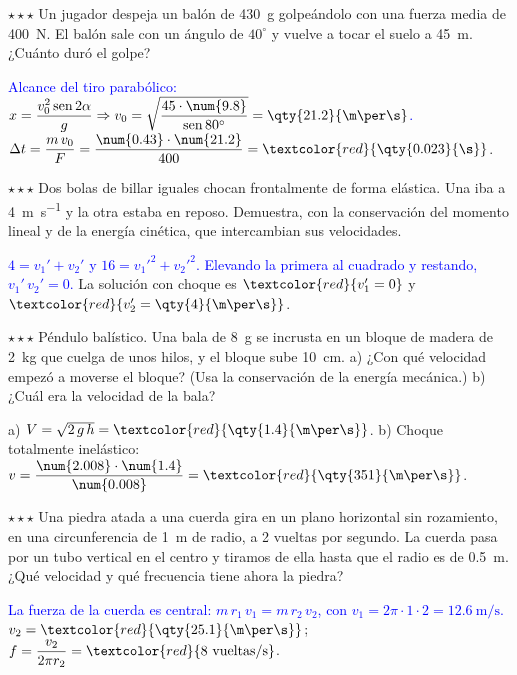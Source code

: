 \begin{exercise}
    \(\star\star\star\) Un jugador despeja un balón de \qty{430}{\g} golpeándolo con una fuerza media de \qty{400}{\newton}. El balón
    sale con un ángulo de \(40^\circ\) y vuelve a tocar el suelo a \qty{45}{\m}. ¿Cuánto duró el golpe?
    \begin{solu}
        \textcolor{blue}{Alcance del tiro parabólico: \(x = \dfrac{v_0^2\sen 2\alpha}{g} \Rightarrow v_0 = \sqrt{\dfrac{45 \cdot \num{9.8}}{\sen 80^\circ}} = \qty{21.2}{\m\per\s}\).}
        \(\Delta t = \dfrac{m\,v_0}{F} = \dfrac{\num{0.43} \cdot \num{21.2}}{400} = \textcolor{red}{\qty{0.023}{\s}}\).
    \end{solu}
\end{exercise}

\begin{exercise}
    \(\star\star\star\) Dos bolas de billar iguales chocan frontalmente de forma elástica. Una iba a \qty{4}{\m\per\s} y la otra
    estaba en reposo. Demuestra, con la conservación del momento lineal y de la energía cinética, que intercambian sus velocidades.
    \begin{solu}
        \textcolor{blue}{\(4 = v_1' + v_2'\) y \(16 = v_1'^2 + v_2'^2\). Elevando la primera al cuadrado y restando, \(v_1'\,v_2' = 0\).}
        La solución con choque es \(\textcolor{red}{v_1' = 0}\) y \(\textcolor{red}{v_2' = \qty{4}{\m\per\s}}\).
    \end{solu}
\end{exercise}

\begin{exercise}
    \(\star\star\star\) Péndulo balístico. Una bala de \qty{8}{\g} se incrusta en un bloque de madera de \qty{2}{\kg} que cuelga de
    unos hilos, y el bloque sube \qty{10}{\cm}. a) ¿Con qué velocidad empezó a moverse el bloque? (Usa la conservación de la energía
    mecánica.) b) ¿Cuál era la velocidad de la bala?
    \begin{solu}
        a) \(V = \sqrt{2\,g\,h} = \textcolor{red}{\qty{1.4}{\m\per\s}}\). b) Choque totalmente inelástico: \(v = \dfrac{\num{2.008} \cdot
        \num{1.4}}{\num{0.008}} = \textcolor{red}{\qty{351}{\m\per\s}}\).
    \end{solu}
\end{exercise}

\begin{exercise}
    \(\star\star\star\) Una piedra atada a una cuerda gira en un plano horizontal sin rozamiento, en una circunferencia de \qty{1}{\m}
    de radio, a 2 vueltas por segundo. La cuerda pasa por un tubo vertical en el centro y tiramos de ella hasta que el radio es de
    \qty{0.5}{\m}. ¿Qué velocidad y qué frecuencia tiene ahora la piedra?
    \begin{solu}
        \textcolor{blue}{La fuerza de la cuerda es central: \(m\,r_1\,v_1 = m\,r_2\,v_2\), con \(v_1 = 2\pi \cdot 1 \cdot 2 = \qty{12.6}{\m\per\s}\).}
        \(v_2 = \textcolor{red}{\qty{25.1}{\m\per\s}}\); \(f = \dfrac{v_2}{2\pi r_2} = \textcolor{red}{8~\text{vueltas/s}}\).
    \end{solu}
\end{exercise}

